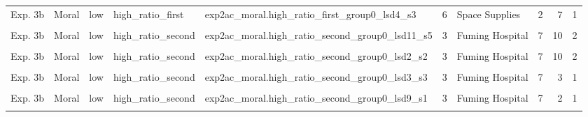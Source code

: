 \documentclass[
]{article}
\begin{document}
\begin{longtable}[t]{lllllrlrrr}
Exp. 3b & Moral & low & high\_ratio\_first & exp2ac\_moral.high\_ratio\_first\_group0\_lsd4\_s3 & 6 & Space Supplies & 2 & 7 & 1\\
\addlinespace
\cellcolor{gray!10}{Exp. 3b} & \cellcolor{gray!10}{Moral} & \cellcolor{gray!10}{low} & \cellcolor{gray!10}{high\_ratio\_first} & \cellcolor{gray!10}{exp2ac\_moral.high\_ratio\_first\_group0\_lsd5\_s4} & \cellcolor{gray!10}{7} & \cellcolor{gray!10}{Flooding Valleys} & \cellcolor{gray!10}{1} & \cellcolor{gray!10}{6} & \cellcolor{gray!10}{1}\\
Exp. 3b & Moral & low & high\_ratio\_second & exp2ac\_moral.high\_ratio\_second\_group0\_lsd11\_s5 & 3 & Fuming Hospital & 7 & 10 & 2\\
\cellcolor{gray!10}{Exp. 3b} & \cellcolor{gray!10}{Moral} & \cellcolor{gray!10}{low} & \cellcolor{gray!10}{high\_ratio\_second} & \cellcolor{gray!10}{exp2ac\_moral.high\_ratio\_second\_group0\_lsd2\_s1} & \cellcolor{gray!10}{3} & \cellcolor{gray!10}{Fuming Hospital} & \cellcolor{gray!10}{7} & \cellcolor{gray!10}{1} & \cellcolor{gray!10}{2}\\
Exp. 3b & Moral & low & high\_ratio\_second & exp2ac\_moral.high\_ratio\_second\_group0\_lsd2\_s2 & 3 & Fuming Hospital & 7 & 10 & 2\\
\cellcolor{gray!10}{Exp. 3b} & \cellcolor{gray!10}{Moral} & \cellcolor{gray!10}{low} & \cellcolor{gray!10}{high\_ratio\_second} & \cellcolor{gray!10}{exp2ac\_moral.high\_ratio\_second\_group0\_lsd3\_s1} & \cellcolor{gray!10}{3} & \cellcolor{gray!10}{Fuming Hospital} & \cellcolor{gray!10}{7} & \cellcolor{gray!10}{8} & \cellcolor{gray!10}{1}\\
\addlinespace
Exp. 3b & Moral & low & high\_ratio\_second & exp2ac\_moral.high\_ratio\_second\_group0\_lsd3\_s3 & 3 & Fuming Hospital & 7 & 3 & 1\\
\cellcolor{gray!10}{Exp. 3b} & \cellcolor{gray!10}{Moral} & \cellcolor{gray!10}{low} & \cellcolor{gray!10}{high\_ratio\_second} & \cellcolor{gray!10}{exp2ac\_moral.high\_ratio\_second\_group0\_lsd6\_s2} & \cellcolor{gray!10}{3} & \cellcolor{gray!10}{Fuming Hospital} & \cellcolor{gray!10}{7} & \cellcolor{gray!10}{10} & \cellcolor{gray!10}{2}\\
Exp. 3b & Moral & low & high\_ratio\_second & exp2ac\_moral.high\_ratio\_second\_group0\_lsd9\_s1 & 3 & Fuming Hospital & 7 & 2 & 1\\
\cellcolor{gray!10}{Exp. 3b} & \cellcolor{gray!10}{Moral} & \cellcolor{gray!10}{low} & \cellcolor{gray!10}{high\_ratio\_second} & \cellcolor{gray!10}{exp2ac\_moral.high\_ratio\_second\_group0\_lsd11\_s3} & \cellcolor{gray!10}{2} & \cellcolor{gray!10}{Bomb on the Train} & \cellcolor{gray!10}{5} & \cellcolor{gray!10}{10} & \cellcolor{gray!10}{1}\\

\end{longtable}
\end{document}
